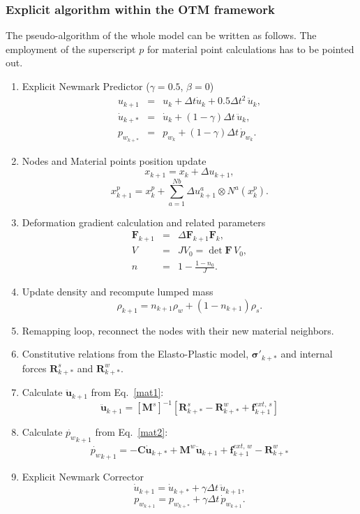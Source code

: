 \documentclass[twocolumn]{svjour3}          %
\begin{document}
\subsubsection{Explicit algorithm within the OTM framework} \label{subsec:421}
The pseudo-algorithm of the whole model can be written as follows. The employment of the superscript $p$ for material point calculations has to be pointed out.
\begin{enumerate}
\item  Explicit Newmark Predictor ($\gamma=0.5$, $\beta=0$)
\begin{eqnarray*}
u_{k+1} &=&u_k+\Delta t \dot{u}_{k}+0.5\Delta t^2 \, \ddot{u}_k, \\
\dot{u}_{k+*}&=&\dot{u}_{k}+(1-\gamma)\Delta t \,  \ddot{u}_{k}, \\
p_{w_{k+*}} &=&p_{w_k}+(1-\gamma)\Delta t \, \dot{p}_{w_k}.
\end{eqnarray*}
\item  Nodes and Material points position update
$$
x_{k+1}=x_{k}+\Delta u_{k+1},
$$
$$
x_{k+1}^p=x_{k}^p+\sum_{a=1}^{Nb}\Delta u_{k+1}^a \otimes N^a(x^p_{k}).
$$
\item Deformation gradient calculation and related parameters
\begin{eqnarray*}
\mathbf{F}_{k+1} &=& \Delta \mathbf{F}_{k+1} \mathbf{F}_{k}, \\
V&=&JV_0=\det \mathbf{F} \, V_0,\\
n&=&1-\frac{1-n_0}{J}.
\end{eqnarray*}
\item Update density and recompute lumped mass
$$
\rho_{k+1}=n_{k+1}\rho_{w}+(1-n_{k+1})\rho_s.
$$
\item Remapping loop, reconnect the nodes with their new material neighbors.
\item Constitutive relations from the  Elasto-Plastic model, $\boldsymbol{\sigma'}_{k+*}$ and internal forces $\boldsymbol{R}^s_{k+*}$ and $\boldsymbol{R}^w_{k+*}$.
\item Calculate $\boldsymbol{\ddot{u}}_{k+1}$ from Eq.~\eqref{mat1}:
$$
\ddot{\boldsymbol{u}}_{k+1} =  \left[\boldsymbol{M}^s \right]^{-1}\left[\boldsymbol{R}^s_{k+*}- \boldsymbol{R}^w_{k+*} + \boldsymbol{f}^{ext, \, s}_{k+1}\right]
$$
\item Calculate $\dot{p_w}_{k+1}$ from Eq.~\eqref{mat2}:
$$
\dot{p_w}_{k+1}=- \boldsymbol{C} \dot{\boldsymbol{u}}_{k+*} + \boldsymbol{M}^w \ddot{\boldsymbol{u}}_{k+1} + \boldsymbol{f}^{ext, \, w}_{k+1}-\boldsymbol{R}^{w}_{k+*}
$$
\item Explicit Newmark Corrector
$$
\dot{u}_{k+1}=\dot{u}_{k+*}+\gamma \Delta t \, \ddot{u}_{k+1},
$$
$$
{p}_{w_{k+1}}={p}_{w_{k+*}}+\gamma \Delta t \, \dot{p}_{w_{k+1}}.
$$
\end{enumerate}
\end{document}

